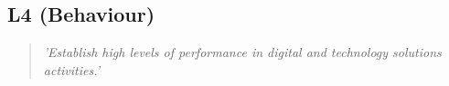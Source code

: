 \subsection{L4 (Behaviour)}

  \begin{quote}
    \textit{'Establish high levels of performance in
    digital and technology solutions activities.'}
  \end{quote}

\newpage